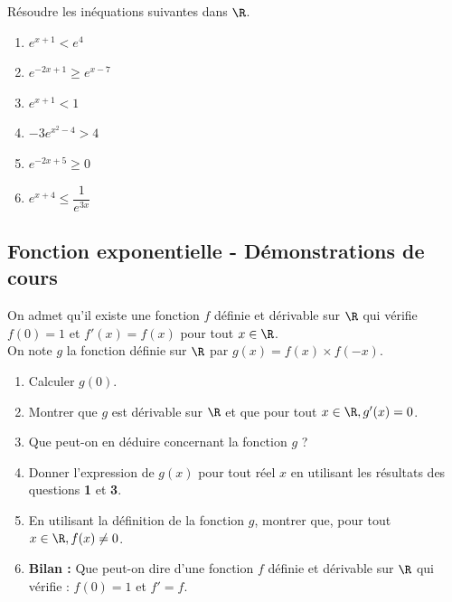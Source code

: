 \documentclass[a4paper,11pt,exos]{nsi} %
\begin{document}
\exo{}
Résoudre les inéquations suivantes dans $\R$.
\begin{multicols}{3}
	\begin{enumerate}
		\item 	$e^{x+1}<e^4$
		\item 	$e^{-2x+1}\geqslant e^{x-7}$
		\item	$e^{x+1}<1$
		\item	$-3e^{x^2-4}>4$
		\item	$e^{-2x+5}\geqslant 0$
		\item	$e^{x+4}	\leqslant\dfrac{1}{e^{3x}}$
	\end{enumerate}
\end{multicols}

\subsection*{Fonction exponentielle - Démonstrations de cours}
On admet qu'il existe une fonction $f$ définie et dérivable sur $\R$ qui vérifie $f(0)=1$ et $f'(x)=f(x)$ pour tout $x\in\R$.\\
On note $g$ la fonction définie sur $\R$ par $g(x)=f(x)\times f(-x)$.
\begin{enumerate}
	\item 	Calculer $g(0)$.
	\item 	Montrer que $g$ est dérivable sur $\R$ et que pour tout $x\in\R, g'(x)=0$.
	\item	Que peut-on en déduire concernant la fonction $g$ ?
	\item	Donner l'expression de $g(x)$ pour tout réel $x$ en utilisant les résultats des questions \textbf{1} et \textbf{3}.
	\item	En utilisant la définition de la fonction $g$, montrer que, pour tout $x\in\R, f(x)\neq 0$.
	\item	\textbf{Bilan :} Que peut-on dire d'une fonction $f$ définie et dérivable sur $\R$ qui vérifie : $f(0)=1$ et $f'=f$.	
\end{enumerate}
\end{document}
